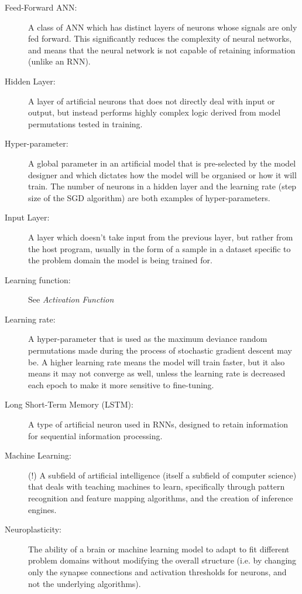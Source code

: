 \documentclass[]{report}
\begin{document}
\begin{description}
\item[Feed-Forward ANN:] A class of ANN which has distinct layers of neurons whose signals are only fed forward. This significantly reduces the complexity of neural networks, and means that the neural network is not capable of retaining information (unlike an RNN).

\item[Hidden Layer:] A layer of artificial neurons that does not directly deal with input or output, but instead performs highly complex logic derived from model permutations tested in training.

\item[Hyper-parameter:] A global parameter in an artificial model that is pre-selected by the model designer and which dictates how the model will be organised or how it will train. The number of neurons in a hidden layer and the learning rate (step size of the SGD algorithm) are both examples of hyper-parameters.

\item[Input Layer:] A layer which doesn't take input from the previous layer, but rather from the host program, usually in the form of a sample in a dataset specific to the problem domain the model is being trained for.

\item[Learning function:] See \textit{Activation Function}

\item[Learning rate:] A hyper-parameter that is used as the maximum deviance random permutations made during the process of stochastic gradient descent may be. A higher learning rate means the model will train faster, but it also means it may not converge as well, unless the learning rate is decreased each epoch to make it more sensitive to fine-tuning.

\item[Long Short-Term Memory (LSTM):] A type of artificial neuron used in RNNs, designed to retain information for sequential information processing.

\item[Machine Learning:] (!) A subfield of artificial intelligence (itself a subfield of computer science) that deals with teaching machines to learn, specifically through pattern recognition and feature mapping algorithms, and the creation of inference engines.

\item[Neuroplasticity:] The ability of a brain or machine learning model to adapt to fit different problem domains without modifying the overall structure (i.e. by changing only the synapse connections and activation thresholds for neurons, and not the underlying algorithms).


\end{description}
\end{document}
